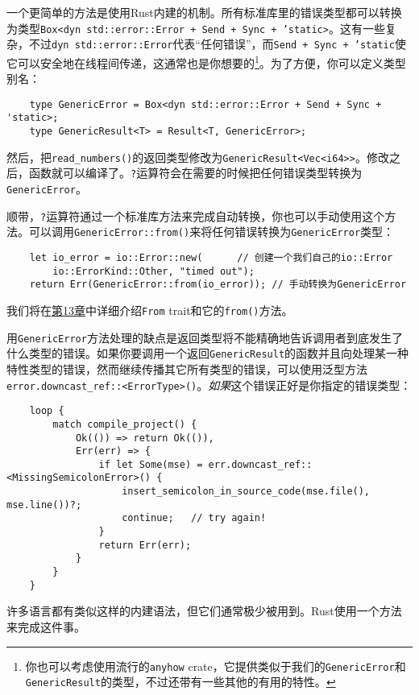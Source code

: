 一个更简单的方法是使用Rust内建的机制。所有标准库里的错误类型都可以转换为类型\texttt{Box<dyn std::error::Error + Send + Sync + 'static>}。这有一些复杂，不过\texttt{dyn std::error::Error}代表“任何错误”，而\texttt{Send + Sync + 'static}使它可以安全地在线程间传递，这通常也是你想要的\footnote{你也可以考虑使用流行的\texttt{anyhow} crate，它提供类似于我们的\texttt{GenericError}和\texttt{GenericResult}的类型，不过还带有一些其他的有用的特性。}。为了方便，你可以定义类型别名：
\begin{verbatim}
    type GenericError = Box<dyn std::error::Error + Send + Sync + 'static>;
    type GenericResult<T> = Result<T, GenericError>;
\end{verbatim}

然后，把\texttt{read\_numbers()}的返回类型修改为\texttt{GenericResult<Vec<i64>>}。修改之后，函数就可以编译了。\texttt{?}运算符会在需要的时候把任何错误类型转换为\texttt{GenericError}。

顺带，\texttt{?}运算符通过一个标准库方法来完成自动转换，你也可以手动使用这个方法。可以调用\texttt{GenericError::from()}来将任何错误转换为\texttt{GenericError}类型：
\begin{verbatim}
    let io_error = io::Error::new(      // 创建一个我们自己的io::Error
        io::ErrorKind::Other, "timed out");
    return Err(GenericError::from(io_error)); // 手动转换为GenericError
\end{verbatim}

我们将在\hyperref[ch13]{第13章}中详细介绍\texttt{From} trait和它的\texttt{from()}方法。

用\texttt{GenericError}方法处理的缺点是返回类型将不能精确地告诉调用者到底发生了什么类型的错误。如果你要调用一个返回\texttt{GenericResult}的函数并且向处理某一种特性类型的错误，然而继续传播其它所有类型的错误，可以使用泛型方法\texttt{error.downcast\_ref::<ErrorType>()}。\emph{如果}这个错误正好是你指定的错误类型：
\begin{verbatim}
    loop {
        match compile_project() {
            Ok(()) => return Ok(()),
            Err(err) => {
                if let Some(mse) = err.downcast_ref::<MissingSemicolonError>() {
                    insert_semicolon_in_source_code(mse.file(), mse.line())?;
                    continue;   // try again!
                }
                return Err(err);
            }
        }
    }
\end{verbatim}

许多语言都有类似这样的内建语法，但它们通常极少被用到。Rust使用一个方法来完成这件事。

